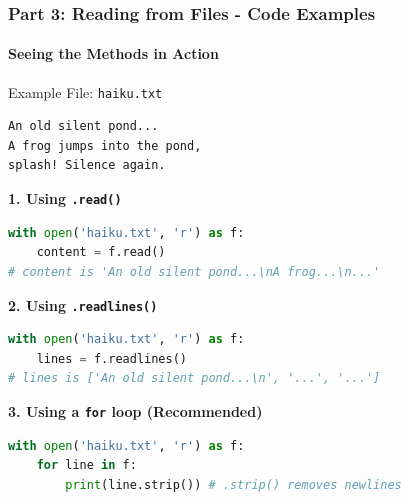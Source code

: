 \documentclass{beamer}
\begin{document}
\begin{frame}[fragile]
    \frametitle{Part 3: Reading from Files - Code Examples}
    \framesubtitle{Seeing the Methods in Action}

    \begin{block}{Example File: \texttt{haiku.txt}}
        \begin{verbatim}
An old silent pond...
A frog jumps into the pond,
splash! Silence again.
        \end{verbatim}
    \end{block}

    \textbf{1. Using \texttt{.read()}}
    \begin{lstlisting}[language=Python]
with open('haiku.txt', 'r') as f:
    content = f.read()
# content is 'An old silent pond...\nA frog...\n...'
    \end{lstlisting}

    \textbf{2. Using \texttt{.readlines()}}
    \begin{lstlisting}[language=Python]
with open('haiku.txt', 'r') as f:
    lines = f.readlines()
# lines is ['An old silent pond...\n', '...', '...']
    \end{lstlisting}

    \textbf{3. Using a \texttt{for} loop (Recommended)}
    \begin{lstlisting}[language=Python]
with open('haiku.txt', 'r') as f:
    for line in f:
        print(line.strip()) # .strip() removes newlines
    \end{lstlisting}
\end{frame}
\end{document}
